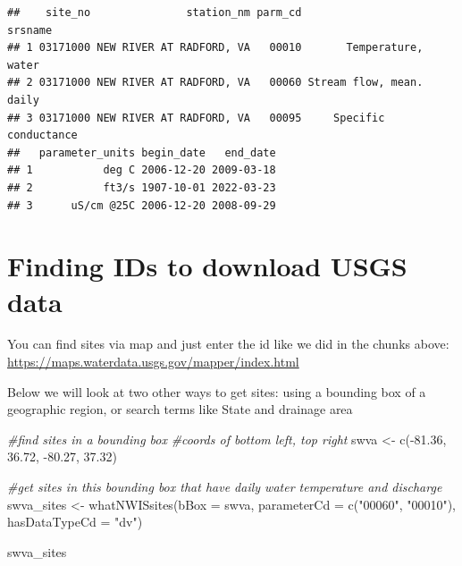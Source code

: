 \documentclass[
]{book}
\newenvironment{Shaded}{\begin{snugshade}}{\end{snugshade}}
\newcommand{\AttributeTok}[1]{\textcolor[rgb]{0.77,0.63,0.00}{#1}}
\newcommand{\CommentTok}[1]{\textcolor[rgb]{0.56,0.35,0.01}{\textit{#1}}}
\newcommand{\FloatTok}[1]{\textcolor[rgb]{0.00,0.00,0.81}{#1}}
\newcommand{\FunctionTok}[1]{\textcolor[rgb]{0.00,0.00,0.00}{#1}}
\newcommand{\NormalTok}[1]{#1}
\newcommand{\OtherTok}[1]{\textcolor[rgb]{0.56,0.35,0.01}{#1}}
\newcommand{\SpecialCharTok}[1]{\textcolor[rgb]{0.00,0.00,0.00}{#1}}
\newcommand{\StringTok}[1]{\textcolor[rgb]{0.31,0.60,0.02}{#1}}
\begin{document}
\begin{verbatim}
##    site_no               station_nm parm_cd                  srsname
## 1 03171000 NEW RIVER AT RADFORD, VA   00010       Temperature, water
## 2 03171000 NEW RIVER AT RADFORD, VA   00060 Stream flow, mean. daily
## 3 03171000 NEW RIVER AT RADFORD, VA   00095     Specific conductance
##   parameter_units begin_date   end_date
## 1           deg C 2006-12-20 2009-03-18
## 2           ft3/s 1907-10-01 2022-03-23
## 3      uS/cm @25C 2006-12-20 2008-09-29
\end{verbatim}

\hypertarget{finding-ids-to-download-usgs-data}{%
\section{Finding IDs to download USGS data}\label{finding-ids-to-download-usgs-data}}

You can find sites via map and just enter the id like we did in the chunks above: \url{https://maps.waterdata.usgs.gov/mapper/index.html}

Below we will look at two other ways to get sites: using a bounding box of a geographic region, or search terms like State and drainage area

\begin{Shaded}
\begin{Highlighting}[]
\CommentTok{\#find sites in a bounding box}
\CommentTok{\#coords of bottom left, top right}
\NormalTok{swva }\OtherTok{\textless{}{-}} \FunctionTok{c}\NormalTok{(}\SpecialCharTok{{-}}\FloatTok{81.36}\NormalTok{, }\FloatTok{36.72}\NormalTok{, }\SpecialCharTok{{-}}\FloatTok{80.27}\NormalTok{, }\FloatTok{37.32}\NormalTok{)}

\CommentTok{\#get sites in this bounding box that have daily water temperature and discharge}
\NormalTok{swva\_sites }\OtherTok{\textless{}{-}} \FunctionTok{whatNWISsites}\NormalTok{(}\AttributeTok{bBox =}\NormalTok{ swva, }
                            \AttributeTok{parameterCd =} \FunctionTok{c}\NormalTok{(}\StringTok{"00060"}\NormalTok{, }\StringTok{"00010"}\NormalTok{), }
                            \AttributeTok{hasDataTypeCd =} \StringTok{"dv"}\NormalTok{)}

\NormalTok{swva\_sites}
\end{Highlighting}
\end{Shaded}
\end{document}
